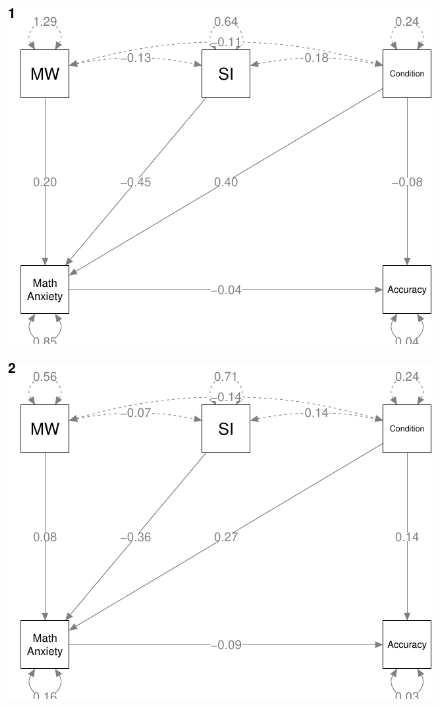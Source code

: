 \documentclass[
  letterpaper,
  DIV=11,
  numbers=noendperiod]{scrartcl}
\begin{document}
\begin{figure}[H]

{\centering \includegraphics{modeling2_files/figure-pdf/unnamed-chunk-13-3.pdf}

}

\end{figure}

\begin{figure}[H]

{\centering \includegraphics{modeling2_files/figure-pdf/unnamed-chunk-13-4.pdf}

}

\end{figure}
\end{document}
